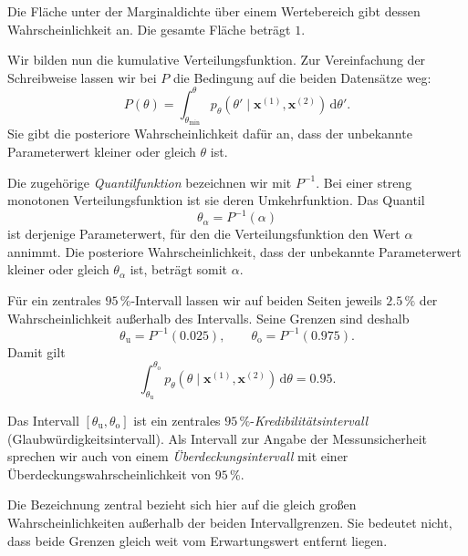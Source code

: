 Die Fläche unter der Marginaldichte über einem Wertebereich
gibt dessen Wahrscheinlichkeit an. Die gesamte Fläche
beträgt $1$.


Wir bilden nun die kumulative Verteilungsfunktion.
Zur Vereinfachung der Schreibweise lassen wir bei $P$
die Bedingung auf die beiden Datensätze weg:
\begin{equation}
P(\theta)
=
\int_{\theta_{\mathrm{min}}}^{\theta}
p_{\theta}(\theta'\mid\mathbf x^{(1)},\mathbf x^{(2)})
\,\mathrm d\theta'.
\label{eq:verteilungsfunktionthetaposterior}
\end{equation}
Sie gibt die posteriore Wahrscheinlichkeit dafür an,
dass der unbekannte Parameterwert kleiner oder gleich
$\theta$ ist.

Die zugehörige \textsl{Quantilfunktion} bezeichnen wir mit $P^{-1}$.
Bei einer streng monotonen Verteilungsfunktion ist sie
deren Umkehrfunktion. Das Quantil
\begin{equation}
\theta_{\alpha}=P^{-1}(\alpha)
\end{equation}
ist derjenige
Parameterwert, für den die Verteilungsfunktion den Wert
$\alpha$ annimmt. Die posteriore Wahrscheinlichkeit,
dass der unbekannte Parameterwert kleiner oder gleich
$\theta_{\alpha}$ ist, beträgt somit $\alpha$.

Für ein zentrales $95\,\%$-Intervall lassen wir auf
beiden Seiten jeweils $2.5\,\%$ der Wahrscheinlichkeit
außerhalb des Intervalls. Seine Grenzen sind deshalb
\begin{equation}
\theta_{\mathrm u}=P^{-1}(0.025),
\qquad
\theta_{\mathrm o}=P^{-1}(0.975).
\label{eq:grenzenueberdeckungsintervall}
\end{equation}
Damit gilt
\begin{equation}
\int_{\theta_{\mathrm u}}^{\theta_{\mathrm o}}
p_{\theta}(\theta\mid\mathbf x^{(1)},\mathbf x^{(2)})
\,\mathrm d\theta
=
0.95.
\end{equation}

Das Intervall $[\theta_{\mathrm u},\theta_{\mathrm o}]$
ist ein zentrales $95\,\%$-\textsl{Kredibilitätsintervall}
(Glaubwürdigkeitsintervall). Als Intervall zur Angabe
der Messunsicherheit sprechen wir auch von einem
\textsl{Überdeckungsintervall} mit einer Überdeckungswahrscheinlichkeit
von $95\,\%$.

Die Bezeichnung \glqq zentral\grqq{} bezieht sich hier auf
die gleich großen Wahrscheinlichkeiten außerhalb der beiden
Intervallgrenzen. Sie bedeutet nicht, dass beide Grenzen
gleich weit vom Erwartungswert entfernt liegen.

